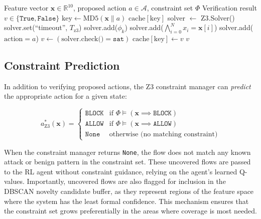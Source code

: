 \documentclass[12pt, letterpaper, oneside]{report}
\newcommand{\R}{\mathbb{R}}
\newcommand{\bx}{\mathbf{x}}
\begin{document}
\begin{algorithm}[htbp]
\caption{Z3 Action Verification}
\label{alg:z3_verify}
\begin{algorithmic}[1]
\Require Feature vector $\bx \in \R^{10}$, proposed action $a \in \mathcal{A}$, constraint set $\Phi$
\Ensure Verification result $v \in \{\texttt{True}, \texttt{False}\}$
\State $\text{key} \leftarrow \text{MD5}(\bx \| a)$
    \Return $\text{cache}[\text{key}]$
\EndIf
\State solver $\leftarrow$ Z3.Solver()
\State solver.set(``timeout'', $T_{\text{z3}}$) 
    \State solver.add($\phi_k$)
\EndFor
\State solver.add($\bigwedge_{i=0}^{N} x_i = \bx[i]$) 
\State solver.add($\text{action} = a$)
\State $v \leftarrow (\text{solver.check()} = \texttt{sat})$
\State $\text{cache}[\text{key}] \leftarrow v$
\State \Return $v$
\end{algorithmic}
\end{algorithm}

\subsection{Constraint Prediction}

In addition to verifying proposed actions, the Z3 constraint manager can \emph{predict} the appropriate action for a given state:

\begin{equation}
\label{eq:z3_predict}
a^*_{\text{Z3}}(\bx) = \begin{cases}
\texttt{BLOCK} & \text{if } \Phi \models (\bx \implies \texttt{BLOCK}) \\
\texttt{ALLOW} & \text{if } \Phi \models (\bx \implies \texttt{ALLOW}) \\
\texttt{None} & \text{otherwise (no matching constraint)}
\end{cases}
\end{equation}

\noindent When the constraint manager returns \texttt{None}, the flow does not match any known attack or benign pattern in the constraint set. These uncovered flows are passed to the RL agent without constraint guidance, relying on the agent's learned Q-values. Importantly, uncovered flows are also flagged for inclusion in the DBSCAN novelty candidate buffer, as they represent regions of the feature space where the system has the least formal confidence. This mechanism ensures that the constraint set grows preferentially in the areas where coverage is most needed.
\end{document}
